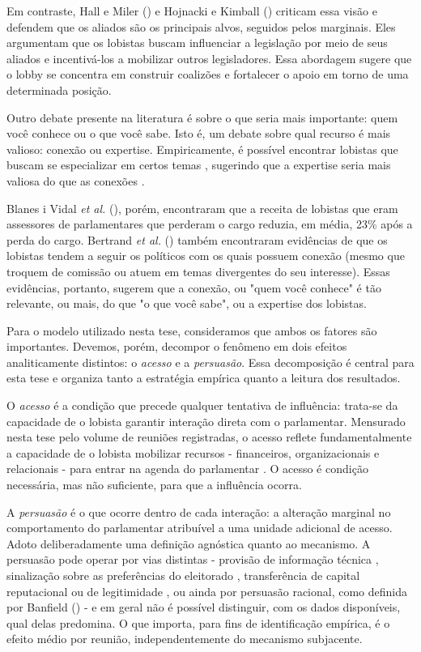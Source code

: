 Em contraste, Hall e Miler (\citeyear{Hall2006}) e Hojnacki e Kimball (\citeyear{hojnacki2001pac}) criticam essa visão e defendem que os aliados são os principais alvos, seguidos pelos marginais. Eles argumentam que os lobistas buscam influenciar a legislação por meio de seus aliados e incentivá-los a mobilizar outros legisladores. Essa abordagem sugere que o lobby se concentra em construir coalizões e fortalecer o apoio em torno de uma determinada posição.

Outro debate presente na literatura é sobre o que seria mais importante: quem você conhece ou o que você sabe. Isto é, um debate sobre qual recurso é mais valioso: conexão ou expertise. Empiricamente, é possível encontrar lobistas que buscam se especializar em certos temas \cite{de_figueiredo_advancing_2014}, sugerindo que a expertise seria mais valiosa do que as conexões \cite{bertrand2014whom}.

Blanes i Vidal \textit{et al.} (\citeyear{blanes2012}), porém, encontraram que a receita de lobistas que eram assessores de parlamentares que perderam o cargo reduzia, em média, 23\% após a perda do cargo. Bertrand \textit{et al.} (\citeyear{bertrand2014whom}) também encontraram evidências de que os lobistas tendem a seguir os políticos com os quais possuem conexão (mesmo que troquem de comissão ou atuem em temas divergentes do seu interesse). Essas evidências, portanto, sugerem que a conexão, ou "quem você conhece" é tão relevante, ou mais, do que "o que você sabe", ou a expertise dos lobistas.

Para o modelo utilizado nesta tese, consideramos que ambos os fatores são importantes. Devemos, porém, decompor o fenômeno em dois efeitos analiticamente distintos: o \textit{acesso} e a \textit{persuasão}. Essa decomposição é central para esta tese e organiza tanto a estratégia empírica quanto a leitura dos resultados.

O \textit{acesso} é a condição que precede qualquer tentativa de influência: trata-se da capacidade de o lobista garantir interação direta com o parlamentar. Mensurado nesta tese pelo volume de reuniões registradas, o acesso reflete fundamentalmente a capacidade de o lobista mobilizar recursos - financeiros, organizacionais e relacionais - para entrar na agenda do parlamentar \cite{hall1990buying, chin2000foot, Bouwen2002}. O acesso é condição necessária, mas não suficiente, para que a influência ocorra.

A \textit{persuasão} é o que ocorre dentro de cada interação: a alteração marginal no comportamento do parlamentar atribuível a uma unidade adicional de acesso. Adoto deliberadamente uma definição agnóstica quanto ao mecanismo. A persuasão pode operar por vias distintas - provisão de informação técnica \cite{kluver_informational_2012, de_figueiredo_advancing_2014}, sinalização sobre as preferências do eleitorado \cite{Hall2006}, transferência de capital reputacional ou de legitimidade \cite{bunea2018legitimacy}, ou ainda por persuasão racional, como definida por Banfield (\citeyear{banfield1961}) - e em geral não é possível distinguir, com os dados disponíveis, qual delas predomina. O que importa, para fins de identificação empírica, é o efeito médio por reunião, independentemente do mecanismo subjacente.

